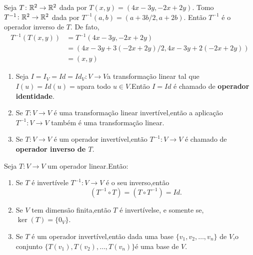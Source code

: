 \begin{exemplo}
    Seja $T \colon \mathbb{R}^2 \to \mathbb{R}^2$ dada por $T(x, y) = (4x - 3y, -2x + 2y)$. Tomo $T^{-1} \colon \mathbb{R}^2 \to \mathbb{R}^2$ dada por $T^{-1}(a, b) = (a + 3b/2, a + 2b)$. Então $T^{-1}$ é o operador inverso de $T$. De fato,
    \begin{align*}
        T^{-1}(T(x, y)) &= T^{-1}(4x - 3y, -2x + 2y) \\ &= (4x - 3y + 3(-2x + 2y)/2, 4x - 3y + 2(-2x + 2y)) \\ &= (x, y)
    \end{align*}
\end{exemplo}

\begin{observacoes}
    \begin{enumerate}[label={\roman*})]
        \item Seja $I = I_V = Id = Id_V \colon V \to V$a transformação linear tal que $I(u) = Id(u) = u$para todo $u \in V$.Então $I = Id$ é chamado de \textbf{operador identidade}.

        \item Se $T \colon V \to V$ é uma transformação linear invertível,então a aplicação $T^{-1} \colon V \to V$ também é uma transformação linear.

        \item Se $T \colon V \to V$ é um operador invertível,então $T^{-1} \colon V \to V$ é chamado de \textbf{operador inverso de $T$}.
    \end{enumerate}
\end{observacoes}

\begin{proposicao}
    Seja $T \colon V \to V$ um operador linear.Então:
    \begin{enumerate}[label={\roman*})]
        \item Se $T$ é invertívele $T^{-1} \colon V \to V$ é o seu inverso,então
        \[
            (T^{-1} \circ T) =(T \circ T^{-1}) =Id.
        \]

        \item Se $V$ tem dimensão finita,então $T$ é invertívelse, e somente se,$\ker(T) = \{0_V\}$.

        \item Se $T$ é um operador invertível,então dada uma base $\{v_1, v_2, \dots, v_n\}$ de $V$,o conjunto $\{T(v_1),T(v_2),\dots, T(v_n)\}$é uma base de $V$.
    \end{enumerate}
\end{proposicao}

